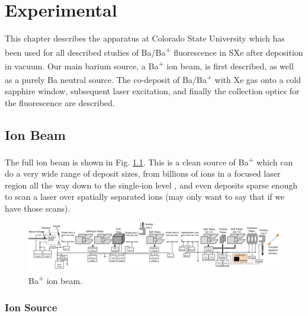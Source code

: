 \chapter{Experimental}

This chapter describes the apparatus at Colorado State University which has been used for all described studies of Ba/Ba\textsuperscript{+} fluorescence in SXe after deposition in vacuum.  Our main barium source, a Ba\textsuperscript{+} ion beam, is first described, as well as a purely Ba neutral source.  The co-deposit of Ba/Ba\textsuperscript{+} with Xe gas onto a cold sapphire window, subsequent laser excitation, and finally the collection optics for the fluorescence are described.

\section{Ion Beam}

The full ion beam is shown in Fig. \ref{fig:ionbeam}.  This is a clean source of Ba\textsuperscript{+} which can do a very wide range of deposit sizes, from billions of ions in a focused laser region all the way down to the single-ion level {\color{gray}, and even deposits sparse enough to scan a laser over spatially separated ions (may only want to say that if we have those scans)}.

\begin{figure} %
        \centering
                \includegraphics[angle=90,width=.25\textwidth]{figures/ionBeam.png}
                \caption{Ba\textsuperscript{+} ion beam.}
\label{fig:ionbeam}
\end{figure}

\subsection{Ion Source}

